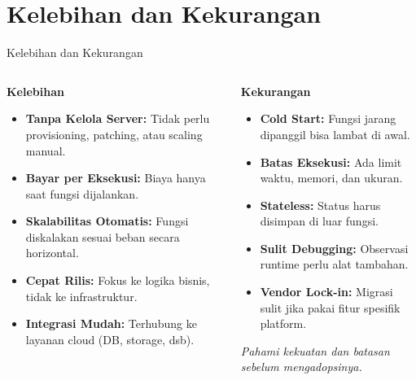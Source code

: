 \documentclass[aspectratio=169, table]{beamer}
\begin{document}
	\section{Kelebihan dan Kekurangan}
	
	\begin{frame}[fragile]{Kelebihan dan Kekurangan }
		\vspace{10pt}
		\begin{columns}[T]
			\begin{column}{0.5\textwidth}
				\textbf{Kelebihan}
				\begin{itemize}
					\item \textbf{Tanpa Kelola Server:} Tidak perlu provisioning, patching, atau scaling manual.
					\item \textbf{Bayar per Eksekusi:} Biaya hanya saat fungsi dijalankan.
					\item \textbf{Skalabilitas Otomatis:} Fungsi diskalakan sesuai beban secara horizontal.
					\item \textbf{Cepat Rilis:} Fokus ke logika bisnis, tidak ke infrastruktur.
					\item \textbf{Integrasi Mudah:} Terhubung ke layanan cloud (DB, storage, dsb).
				\end{itemize}
			\end{column}
			
			\begin{column}{0.5\textwidth}
				\textbf{Kekurangan}
				\begin{itemize}
					\item \textbf{Cold Start:} Fungsi jarang dipanggil bisa lambat di awal.
					\item \textbf{Batas Eksekusi:} Ada limit waktu, memori, dan ukuran.
					\item \textbf{Stateless:} Status harus disimpan di luar fungsi.
					\item \textbf{Sulit Debugging:} Observasi runtime perlu alat tambahan.
					\item \textbf{Vendor Lock-in:} Migrasi sulit jika pakai fitur spesifik platform.
				\end{itemize}
				
				\vspace{6pt}
				\scriptsize
				\textit{Pahami kekuatan dan batasan sebelum mengadopsinya.}
			\end{column}
		\end{columns}
	\end{frame}
	
	
\end{document}
